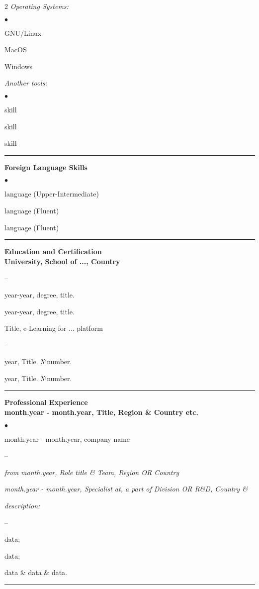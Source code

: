 \documentclass[oneside,final,12pt]{extreport}
\newenvironment{compactlist}{
	\begin{list}{{$\bullet$}}{
		\setlength\leftmargin{0.4cm}
		\setlength\partopsep{0pt}
		\setlength\parskip{0pt}
		\setlength\parsep{0pt}
		\setlength\topsep{0pt}
		\setlength\itemsep{0pt}
	}
}{
	\end{list}
}
\newenvironment{innerlist}{
	\begin{list}{--}{
		\setlength\leftmargin{0.8cm}
		\setlength\partopsep{0pt}
		\setlength\parskip{0pt}
		\setlength\parsep{0pt}
		\setlength\topsep{0pt}
		\setlength\itemsep{0pt}
	}
}{
	\end{list}
}
\begin{document}
\begin{multicols}{2}
\textsl{Operating Systems:}
	\begin{compactlist}
		\item GNU/Linux
		\item MacOS
		\item Windows
	\end{compactlist}
\textsl{Another tools:}
	\begin{compactlist}
		\item skill
		\item skill
		\item skill
	\end{compactlist}
\end{multicols}
\rule{\textwidth}{0.4pt}

\bfseries
Foreign Language Skills
\mdseries
\begin{compactlist}
	\item language (Upper-Intermediate)
	\item language (Fluent)
	\item language (Fluent) 
\end{compactlist}
\rule{\textwidth}{0.4pt}

\bfseries
Education and Certification
\mdseries \\[3pt]	
University, School of ..., Country  	
	 \begin{innerlist}	
	 \item year-year, degree, title. 
	 \item year-year, degree, title. 
	 \end{innerlist}	
Title, e-Learning for ... platform 
	 \begin{innerlist}	
	 \item year, Title. №number.
	 \item year, Title. №number.
	 \end{innerlist}	 
\rule{\textwidth}{0.4pt}

\bfseries
Professional Experience
\mdseries \\[1pt] 
month.year - month.year, Title, Region \& Country etc. 
     \begin{compactlist}
	 \item month.year - month.year, company name
	     \begin{innerlist} 
	     \item \textsl{from month.year, Role title \& Team, Region OR Country} 
	     \item \textsl{month.year - month.year, Specialist at, a part of Division OR R\&D, Country \& } 
        \end{innerlist} 
     \end{compactlist}

         \textsl{description:}
         \begin{innerlist}
	     \item data;
	     \item data; 
	     \item data \& data \& data.
         \end{innerlist}
\rule{\textwidth}{0.4pt}
\end{document}
